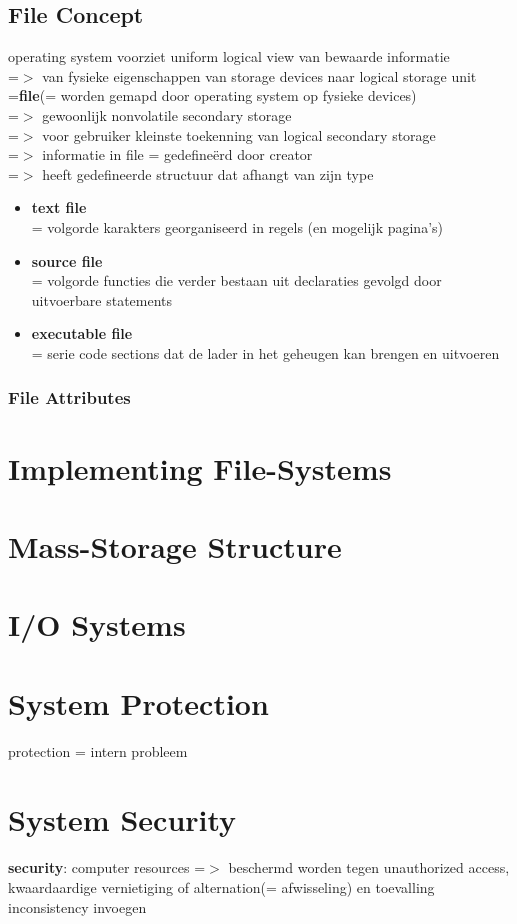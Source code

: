 \documentclass{report}
\begin{document}
\section{File Concept}
operating system voorziet uniform logical view van bewaarde informatie
\\=$>$ van fysieke eigenschappen van storage devices naar logical storage unit =\textbf{file}(= worden gemapd door operating system op fysieke devices)
\\=$>$ gewoonlijk nonvolatile secondary storage
\\=$>$ voor gebruiker kleinste toekenning van logical secondary storage
\\=$>$ informatie in file = gedefine\"erd door creator
\\=$>$ heeft gedefineerde structuur dat afhangt van zijn type
\begin{itemize}
\item \textbf{text file}
\\= volgorde karakters georganiseerd in regels (en mogelijk pagina's)
\item \textbf{source file}
\\= volgorde functies die verder bestaan uit declaraties gevolgd door uitvoerbare statements
\item \textbf{executable file}
\\= serie code sections dat de lader in het geheugen kan brengen en uitvoeren
\end{itemize}
\subsection{File Attributes}

\chapter{Implementing File-Systems}
\chapter{Mass-Storage Structure}
\chapter{I/O Systems}
\chapter{System Protection}
protection = intern probleem
\chapter{System Security}
\textbf{security}: computer resources =$>$ beschermd worden tegen unauthorized access, kwaardaardige vernietiging of alternation(= afwisseling) en toevalling inconsistency invoegen
\end{document}
